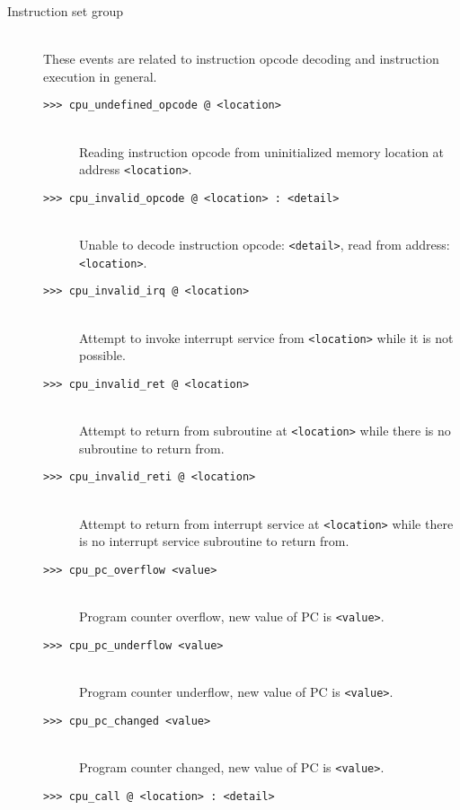 \begin{description}
            \item[Instruction set group]~\\
                These events are related to instruction opcode decoding and instruction execution in general.
                \begin{description}
                    \item[\texttt{>{}>{}> cpu\_undefined\_opcode @ <location>}]~\\
                        Reading instruction opcode from uninitialized memory location at address \texttt{<location>}.
                    \item[\texttt{>{}>{}> cpu\_invalid\_opcode @ <location> : <detail>}]~\\
                        Unable to decode instruction opcode: \texttt{<detail>}, read from address: \texttt{<location>}.
                    \item[\texttt{>{}>{}> cpu\_invalid\_irq @ <location>}]~\\
                        Attempt to invoke interrupt service from \texttt{<location>} while it is not possible.
                    \item[\texttt{>{}>{}> cpu\_invalid\_ret @ <location>}]~\\
                        Attempt to return from subroutine at \texttt{<location>} while there is no subroutine to return from.
                    \item[\texttt{>{}>{}> cpu\_invalid\_reti @ <location>}]~\\
                        Attempt to return from interrupt service at \texttt{<location>} while there is no interrupt service subroutine to return from.
                    \item[\texttt{>{}>{}> cpu\_pc\_overflow <value>}]~\\
                        Program counter overflow, new value of PC is \texttt{<value>}.
                    \item[\texttt{>{}>{}> cpu\_pc\_underflow <value>}]~\\
                        Program counter underflow, new value of PC is \texttt{<value>}.
                    \item[\texttt{>{}>{}> cpu\_pc\_changed <value>}]~\\
                        Program counter changed, new value of PC is \texttt{<value>}.
                    \item[\texttt{>{}>{}> cpu\_call @ <location> : <detail>}]~\\

\end{description}
\end{description}
